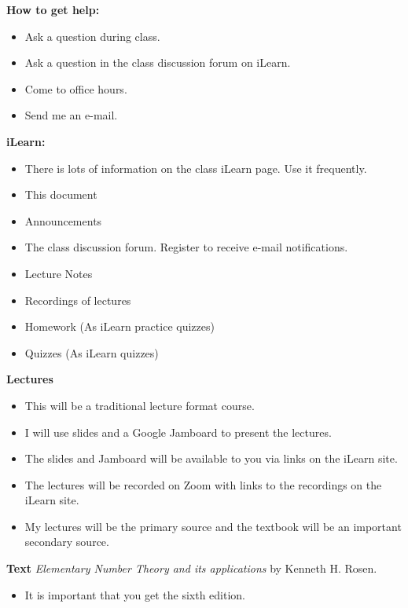\documentclass[oneside,12pt]{amsart}
\begin{document}
\bigskip

\textbf{How to get help:}
\begin{itemize}
\item Ask a question during class.
\item Ask a question in the class discussion forum on iLearn.
\item Come to office hours.
\item Send me an e-mail.
\end{itemize}

\bigskip

\textbf{iLearn:}
\begin{itemize}
\item There is lots of information on the class iLearn page. Use it frequently.
\item This document
\item Announcements
\item The class discussion forum. Register to receive e-mail notifications.
\item Lecture Notes
\item Recordings of lectures
\item Homework (As iLearn practice quizzes)
\item Quizzes (As iLearn quizzes)
\end{itemize}

\bigskip

\textbf{Lectures}
\begin{itemize}
\item This will be a traditional lecture format course.
\item I will use slides and a Google Jamboard to present the lectures.
\item The slides and Jamboard will be available to you via links on the iLearn site.
\item The lectures will be recorded on Zoom with links to the recordings on the iLearn site.
\item My lectures will be the primary source and the textbook will be an important secondary source.
\end{itemize}

\bigskip

\textbf{Text} \emph{Elementary Number Theory and its applications} by Kenneth H. Rosen.
\begin{itemize}
\item It is important that you get the sixth edition.
\end{itemize}
\end{document}
